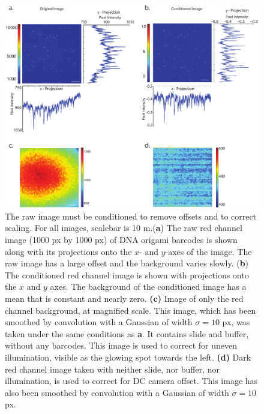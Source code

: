 \begin{figure}[htbp]
\begin{center}
	\includegraphics[width=\textwidth]{figures/theoryConditionedImage}
	\caption{The raw image must be conditioned to remove offsets and to correct scaling. For all images, scalebar is 10 \textmu m.(\textbf{a}) The raw red channel image (1000 px by 1000 px) of DNA origami barcodes is shown along with  its projections onto the $x$- and $y$-axes of the image. The raw image has a large offset and the background varies slowly. (\textbf{b}) The conditioned red channel image is shown with projections onto the $x$ and $y$ axes. The background of the conditioned image has a mean that is constant and nearly zero. \textbf{(c)} Image of only the red channel background, at magnified scale. This image, which has been smoothed by convolution with a Gaussian of width $\sigma=10$ px, was taken under the same conditions as \textbf{a}. It contains slide and buffer, without any barcodes. This image is used to correct for uneven illumination, visible as the glowing spot towards the left.   \textbf{(d)} Dark red channel image taken with neither slide, nor buffer, nor illumination, is used to correct for DC camera offset. This image has also been smoothed by convolution with a Gaussian of width $\sigma=10$ px. \label{fig:conditionedImage}}
\end{center}	
\end{figure}





